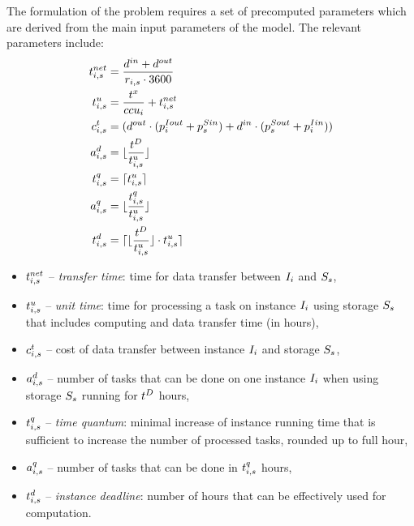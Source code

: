 {  The formulation of the problem requires a set of precomputed parameters which are derived from the main input parameters of the model. The relevant  parameters include:
  \begin{align}
      \transferTime_{i,s} &= \frac{\dataSizeIn+\dataSizeOut}{\transferRate_{i,s} \cdot 3600}  \\
      \label{bot:unitTime}\unitTime_{i,s} &= \frac{\execTime}{\ccu_i} + \transferTime_{i,s}  \\
      \transferCost_{i,s} &= (\dataSizeOut \cdot (\instanceTransferPriceOut_i + \storageTransferPriceIn_s) + \dataSizeIn \cdot (\storageTransferPriceOut_s+\instanceTransferPriceIn_i)) \\
      \label{bot:tasksPerDeadline}\tasksPerDeadline_{i,s} &= \lfloor\frac{\deadline}{\unitTime_{i,s}}\rfloor \\
      \timeQuantum_{i,s} &= \lceil \unitTime_{i,s} \rceil \\
      \tasksPerTimeQuantum_{i,s} &= \lfloor\frac{\timeQuantum_{i,s}}{\unitTime_{i,s}}\rfloor \\
      \label{bot:instanceDeadline}\instanceDeadline_{i,s} &= \lceil\lfloor\frac{\deadline}{\unitTime_{i,s}} \rfloor \cdot \unitTime_{i,s} \rceil
  \end{align}
  \begin{itemize}
      \item $t^{net}_{i,s}$ -- {\em transfer time}: time for data transfer between
      $I_i$ and $S_s$,
      \item $t^u_{i,s}$ -- {\em unit time}: time for processing a task
      on instance $I_i$ using storage $S_s$ that includes computing and
      data transfer time (in hours),
      \item $c^t_{i,s}$ -- cost of data transfer between instance
      $I_i$ and storage $S_s$,
      \item $a^d_{i,s}$ -- number of tasks that can be done on
      one instance $I_i$ when using storage $S_s$ running for $t^D$ hours,
      \item $t^q_{i,s}$ -- {\em time quantum}: minimal increase of
      instance running time that is sufficient to increase the number of
      processed tasks, rounded up to full hour,
      \item $a^q_{i,s}$ -- number of tasks that can be done
      in $t^q_{i,s}$ hours,
      \item $t^d_{i,s}$ -- {\em instance deadline}: number of
      hours that can be effectively used for computation.
  \end{itemize}

}
